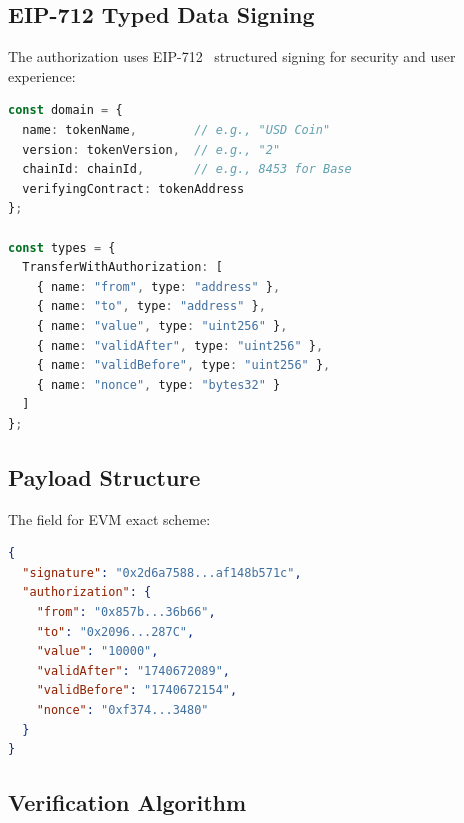 \subsection{EIP-712 Typed Data Signing}

The authorization uses EIP-712~\cite{eip712} structured signing for security and user experience:

\begin{lstlisting}[language=typescript,caption={EIP-712 domain and types}]
const domain = {
  name: tokenName,        // e.g., "USD Coin"
  version: tokenVersion,  // e.g., "2"
  chainId: chainId,       // e.g., 8453 for Base
  verifyingContract: tokenAddress
};

const types = {
  TransferWithAuthorization: [
    { name: "from", type: "address" },
    { name: "to", type: "address" },
    { name: "value", type: "uint256" },
    { name: "validAfter", type: "uint256" },
    { name: "validBefore", type: "uint256" },
    { name: "nonce", type: "bytes32" }
  ]
};
\end{lstlisting}

\subsection{Payload Structure}

The  field for EVM exact scheme:

\begin{lstlisting}[language=json,caption={EVM exact scheme payload}]
{
  "signature": "0x2d6a7588...af148b571c",
  "authorization": {
    "from": "0x857b...36b66",
    "to": "0x2096...287C",
    "value": "10000",
    "validAfter": "1740672089",
    "validBefore": "1740672154",
    "nonce": "0xf374...3480"
  }
}
\end{lstlisting}

\subsection{Verification Algorithm}

